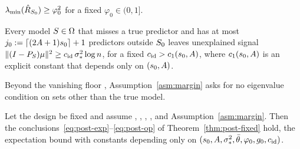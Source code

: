 \begin{localassumption}\label{asm:margin}
\begin{asmitems}
  \item\label{asm:margin-floor} $\lambda_{\min}(\hat R_{S_0})\ge\varphi_0^2$ for a fixed $\varphi_0\in(0,1]$.
  \item\label{asm:margin-margin} Every model $S\in\Omega$ that misses a true predictor and has at most
    $j_0:=\lceil(2A+1)s_0\rceil+1$ predictors outside $S_0$ leaves unexplained signal
    $\lVert (I-P_S)\mu\rVert^2\ge c_{\mathrm{id}}\,\sigma_*^2\log n$, for a fixed $c_{\mathrm{id}}>c_1(s_0,A)$, where $c_1(s_0,A)$ is an
    explicit constant that depends only on $(s_0,A)$.
\end{asmitems}
\end{localassumption}

Beyond the vanishing floor , Assumption~\ref{asm:margin} asks for no eigenvalue condition on sets other than the
true model.


\begin{theorem}\label{thm:post-margin}
Let the design be fixed and assume , , , ,  and Assumption~\ref{asm:margin}. Then
the conclusions~\eqref{eq:post-exp}--\eqref{eq:post-op} of Theorem~\ref{thm:post-fixed} hold, the expectation bound with
constants depending only on $(s_0,A,\sigma_*^2,\bar\theta,\varphi_0,g_0,c_{\mathrm{id}})$.
\end{theorem}


